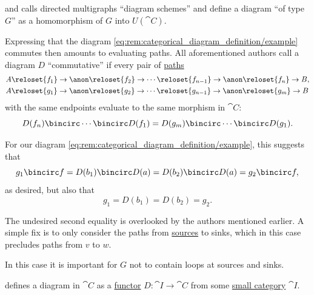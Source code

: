 \begin{remark}
\begin{thmenum}
    \Textcite[10; 41]{MacLane1998CategoryTheory} and \textcite[def. 6.1.1]{Schubert1972Categories} calls directed multigraphs \enquote{diagram schemes} and define a diagram \enquote{of type \( G \)} as a homomorphism of \( G \) into \( U(\cat{C}) \).

     Expressing that the diagram \eqref{eq:rem:categorical_diagram_definition/example} commutes then amounts to evaluating paths. All aforementioned authors call a diagram \( D \) \enquote{commutative} if every pair of \hyperref[def:graph_walk/path]{paths}
    \begin{align*}
      &A \reloset {f_1} \to \anon \reloset {f_2} \to \cdots \reloset {f_{n-1}} \to \anon \reloset {f_n} \to B, \\
      &A \reloset {g_1} \to \anon \reloset {g_2} \to \cdots \reloset {g_{n-1}} \to \anon \reloset {g_m} \to B
    \end{align*}
    with the same endpoints evaluate to the same morphism in \( \cat{C} \):
    \begin{equation*}
      D(f_n) \bincirc \cdots \bincirc D(f_1) = D(g_m) \bincirc \cdots \bincirc D(g_1).
    \end{equation*}

    For our diagram \eqref{eq:rem:categorical_diagram_definition/example}, this suggests that
    \begin{equation*}
      g_1 \bincirc f = D(b_1) \bincirc D(a) = D(b_2) \bincirc D(a) = g_2 \bincirc f,
    \end{equation*}
    as desired, but also that
    \begin{equation*}
      g_1 = D(b_1) = D(b_2) = g_2.
    \end{equation*}

    The undesired second equality is overlooked by the authors mentioned earlier. A simple fix is to only consider the paths from \hyperref[def:graph_source_and_sink]{sources} to sinks, which in this case precludes paths from \( v \) to \( w \).

    In this case it is important for \( G \) not to contain loops at sources and sinks.

     \Textcite[def. 1.4.21]{Perrone2024StartingCategoryTheory} defines a diagram in \( \cat{C} \) as a \hyperref[def:functor]{functor} \( D: \cat{I} \to \cat{C} \) from some \hyperref[def:small_category]{small category} \( \cat{I} \).


\end{thmenum}
\end{remark}
